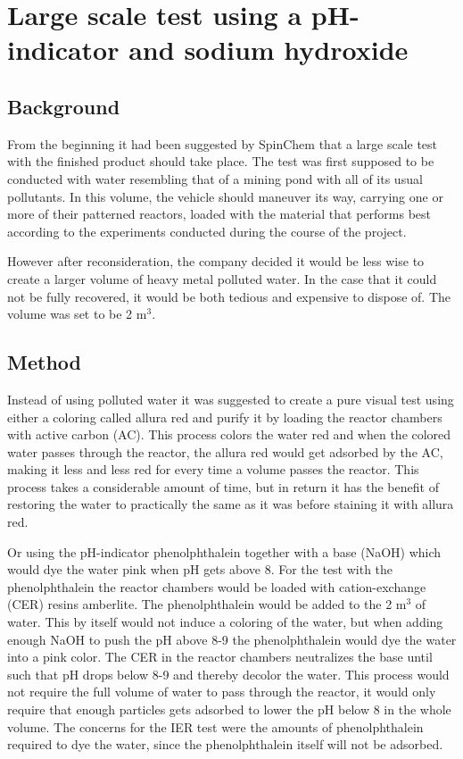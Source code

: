 \section{Large scale test using a pH-indicator and sodium hydroxide}

\subsection{Background}
From the beginning it had been suggested by SpinChem\textsuperscript{\textregistered} that a large scale test with the finished product should take place. The test was first supposed to be conducted with water resembling that of a mining pond with all of its usual pollutants. In this volume, the vehicle should maneuver its way, carrying one or more of their patterned reactors, loaded with the material that performs best according to the experiments conducted during the course of the project.

However after reconsideration, the company decided it would be less wise to create a larger volume of heavy metal polluted water. In the case that it could not be fully recovered, it would be both tedious and expensive to dispose of. The volume was set to be 2 m$^3$.

\subsection{Method}
Instead of using polluted water it was suggested to create a pure visual test using either a coloring called allura red and purify it by loading the reactor chambers with active carbon (AC). This process colors the water red and when the colored water passes through the reactor, the allura red would get adsorbed by the AC, making it less and less red for every time a volume passes the reactor. This process takes a considerable amount of time, but in return it has the benefit of restoring the water to practically the same as it was before staining it with allura red.
 
Or using the pH-indicator phenolphthalein together with a base (NaOH) which would dye the water pink when pH gets above 8. For the test with the phenolphthalein the reactor chambers would be loaded with cation-exchange (CER) resins amberlite. The phenolphthalein would be added to the 2 m$^3$ of water. This by itself would not induce a coloring of the water, but when adding enough NaOH to push the pH above 8-9 the phenolphthalein would dye the water into a pink color. The CER in the reactor chambers neutralizes the base until such that pH drops below 8-9 and thereby decolor the water. This process would not require the full volume of water to pass through the reactor, it would only require that enough particles gets adsorbed to lower the pH below 8 in the whole volume.
The concerns for the IER test were the amounts of phenolphthalein required to dye the water, since the phenolphthalein itself will not be adsorbed.

